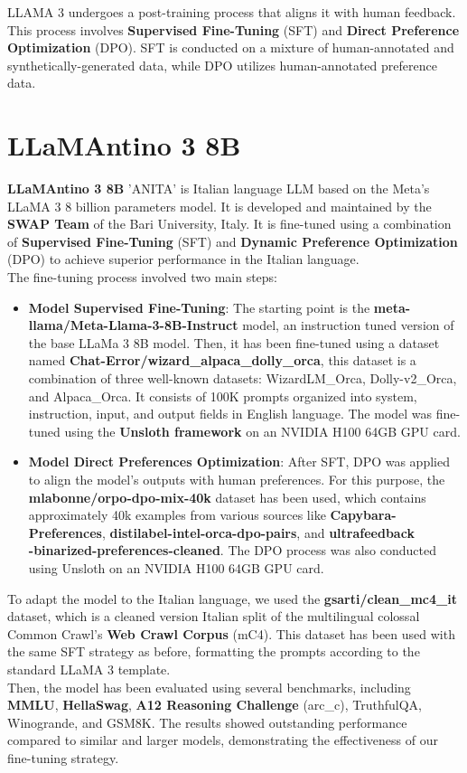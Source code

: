 \documentclass{article}
\begin{document}
		LLAMA 3 undergoes a post-training process that aligns it with human feedback.
		This process involves \textbf{Supervised Fine-Tuning} (SFT) and \textbf{Direct Preference Optimization} (DPO). SFT is conducted on a mixture of human-annotated and synthetically-generated data, while DPO utilizes human-annotated preference data.
		
	\section{LLaMAntino 3 8B}
	\textbf{LLaMAntino 3 8B} 'ANITA' \cite{polignano2024advanced} is Italian language LLM based on the Meta's LLaMA 3 8 billion parameters model. It is developed and maintained by the \textbf{SWAP Team} of the Bari University, Italy. It is fine-tuned using a combination of \textbf{Supervised Fine-Tuning} (SFT) and \textbf{Dynamic Preference Optimization} (DPO) to achieve superior performance in the Italian language. \\
	The fine-tuning process involved two main steps: 
	
	\begin{itemize}
		\item 
			\textbf{Model Supervised Fine-Tuning}: The starting point is the \textbf{meta-llama/Meta-Llama-3-8B-Instruct} model, an instruction tuned version of the base LLaMa 3 8B model. 
			Then, it has been fine-tuned using a dataset named \textbf{Chat-Error/wizard\_alpaca\_dolly\_orca}, this dataset is a combination of three well-known datasets: WizardLM\_Orca, Dolly-v2\_Orca, and Alpaca\_Orca. 
			It consists of 100K prompts organized into system, instruction, input, and output fields in English language.	The model was fine-tuned using the \textbf{Unsloth framework} on an NVIDIA H100 64GB GPU card.
		
		\item 
			\textbf{Model Direct Preferences Optimization}: After SFT, DPO was applied to align the model's outputs with human preferences. For this purpose, the \textbf{mlabonne/orpo-dpo-mix-40k} dataset has been used, which contains approximately 40k examples from various sources like \textbf{Capybara-Preferences}, \textbf{distilabel-intel-orca-dpo-pairs}, and \textbf{ultrafeedback\\-binarized-preferences-cleaned}.
			The DPO process was also conducted using Unsloth on an NVIDIA H100 64GB GPU card.
	\end{itemize}
	
	To adapt the model to the Italian language, we used the \textbf{gsarti/clean\_mc4\_it} dataset, which is a cleaned version Italian split of the multilingual colossal Common Crawl's \textbf{Web Crawl Corpus} (mC4).
	This dataset has been used with the same SFT strategy as before, formatting the prompts according to the standard LLaMA 3 template. \\
	Then, the model has been evaluated using several benchmarks, including \textbf{MMLU}, \textbf{HellaSwag},\textbf{ A12 Reasoning Challenge} (arc\_c), TruthfulQA, Winogrande, and GSM8K. 
	The results showed outstanding performance compared to similar and larger models, demonstrating the effectiveness of our fine-tuning strategy.
	
\end{document}

